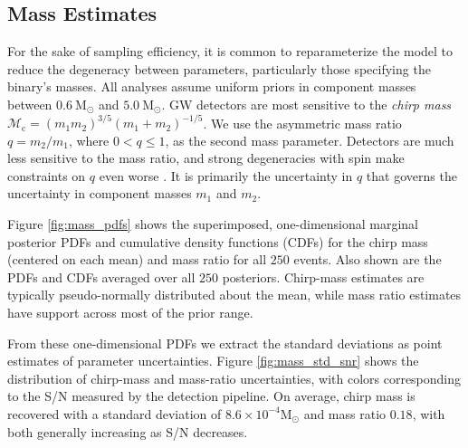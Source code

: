 \subsection{Mass Estimates}

For the sake of sampling efficiency, it is common to reparameterize the model to reduce the degeneracy between parameters, particularly those specifying the binary's masses.  All analyses assume uniform priors in component masses between $0.6~\mathrm{M}_\odot$ and $5.0~\mathrm{M}_\odot$.  GW detectors are most sensitive to the \emph{chirp mass} $\mathcal{M}_\mathrm{c} = (m_1 m_2)^{3/5} (m_1 + m_2)^{-1/5}$.  We use the asymmetric mass ratio $q = m_2/m_1$, where $0 < q \leq 1$, as the second mass parameter.  Detectors are much less sensitive to the mass ratio, and strong degeneracies with spin make constraints on $q$ even worse \citep{Cutler_1994}.  It is primarily the uncertainty in $q$ that governs the uncertainty in component masses $m_1$ and $m_2$.

Figure \ref{fig:mass_pdfs} shows the superimposed, one-dimensional marginal posterior PDFs and cumulative density functions (CDFs) for the chirp mass (centered on each mean) and mass ratio for all $250$ events.  Also shown are the PDFs and CDFs averaged over all $250$ posteriors. Chirp-mass estimates are typically pseudo-normally distributed about the mean, while mass ratio estimates have support across most of the prior range.

From these one-dimensional PDFs we extract the standard deviations as point estimates of parameter uncertainties.  Figure \ref{fig:mass_std_snr} shows the distribution of chirp-mass and mass-ratio uncertainties, with colors corresponding to the S/N measured by the detection pipeline. On average, chirp mass is recovered with a standard deviation of $8.6 \times 10^{-4} \mathrm{M}_\odot$ and mass ratio $0.18$, with both generally increasing as S/N decreases.